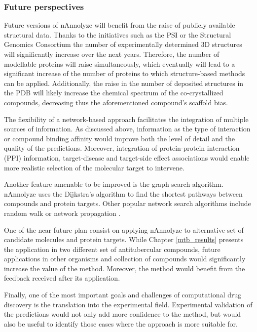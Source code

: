 \documentclass[11pt, b5paper,twoside]{tesi_upf}
\begin{document}
  
  
\subsubsection{Future perspectives}\label{future_nannolyze}

 \par Future versions of nAnnolyze will benefit from the raise of publicly available structural data. Thanks to the initiatives such as the PSI \cite{Norvell2007} or the Structural Genomics Consortium \cite{GIleadi2007} the number of experimentally determined 3D structures will significantly increase over the next years. Therefore, the number of modellable proteins will raise simultaneously, which eventually will lead to a significant increase of the number of proteins to which structure-based methods can be applied. Additionally, the raise in the number of deposited structures in the PDB will likely increase the chemical spectrum of the co-crystallized compounds, decreasing thus the aforementioned compound's scaffold bias.
  
 \par The flexibility of a network-based approach facilitates the integration of multiple sources of information. As discussed above, information as the type of interaction or compound binding affinity would improve both the level of detail and the quality of the predictions. Moreover, integration of protein-protein interaction (PPI) information, target-disease and target-side effect associations would enable more realistic selection of the molecular target to intervene. 
 
 \par Another feature amenable to be improved is the graph search algorithm. nAnnolyze uses the Dijkstra's algorithm \cite{Dijkstra1959} to find the shortest pathways between compounds and protein targets. Other popular network search algorithms include random walk \cite{Chen2012} or network propagation \cite{Huang2013a}.
 \par One of the near future plan consist on applying nAnnolyze to alternative set of candidate molecules and protein targets. While Chapter \ref{mtb_results} presents the application in two different set of antitubercular compounds, future applications in other organisms and collection of compounds would significantly increase the value of the method. Moreover, the method would benefit from the feedback received after its application. 
 \par Finally, one of the most important goals and challenges of computational drug discovery is the translation into the experimental field. Experimental validation of the predictions would not only add more confidence to the method, but would also be useful to identify those cases where the approach is more suitable for.          
\end{document}
